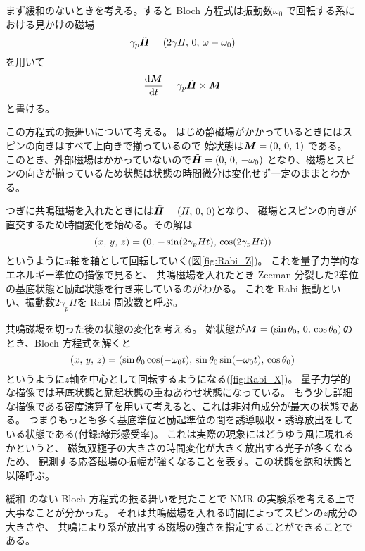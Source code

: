\documentclass[11pt,dvipdfmx,a4paper]{jsarticle}
\begin{document}
まず緩和のないときを考える。すると Bloch 方程式は振動数\(\omega_0\)%
で回転する系における見かけの磁場
\begin{equation}
	\gamma_p \vb*{\tilde{H}} = \qty(2\gamma H,\,0,\,\omega-\omega_0)
\end{equation}
を用いて
\begin{equation}
	\dv{\vb*{M}}{t} = \gamma_p \vb*{\tilde{H}} \times \vb*{M}
\end{equation}
と書ける。

この方程式の振舞いについて考える。
はじめ静磁場がかかっているときにはスピンの向きはすべて上向きで揃っているので
始状態は\(\vb*{M}=(0,\,0,\,1)\)
である。
このとき、外部磁場はかかっていないので\(\vb*{\tilde{H}}=(0,\,0,\,-\omega_0)\)
となり、磁場とスピンの向きが揃っているため状態は状態の時間微分は変化せず一定のままとわかる。

つぎに共鳴磁場を入れたときには\(\vb*{\tilde{H}}=(H,\,0,\,0)\)となり、
磁場とスピンの向きが直交するため時間変化を始める。その解は
\begin{equation}
	(x,\,y,\,z) = \qty(0,\,-\sin(2\gamma_p Ht),\,\cos(2\gamma_p Ht))
\end{equation}
というように\(x\)軸を軸として回転していく(図\ref{fig:Rabi_Z})。
これを量子力学的なエネルギー準位の描像で見ると、
共鳴磁場を入れたとき Zeeman 分裂した2準位の基底状態と励起状態を行き来しているのがわかる。
これを Rabi 振動といい、振動数\(2\gamma_p H\)を Rabi 周波数と呼ぶ。

共鳴磁場を切った後の状態の変化を考える。
始状態が\(\vb*{M}=(\sin\theta_0,\,0,\,\cos\theta_0)\)のとき、Bloch 方程式を解くと
\begin{equation}
	(x,\,y,\,z) =
	\qty(\sin\theta_0\cos(-\omega_0 t),\,
	\sin\theta_0\sin(-\omega_0 t),\,\cos\theta_0)
\end{equation}
というように\(z\)軸を中心として回転するようになる(\ref{fig:Rabi_X})。
量子力学的な描像では基底状態と励起状態の重ねあわせ状態になっている。
もう少し詳細な描像である密度演算子を用いて考えると、これは非対角成分が最大の状態である。
つまりもっとも多く基底準位と励起準位の間を誘導吸収・誘導放出をしている状態である(付録:線形感受率)。
これは実際の現象にはどうゆう風に現れるかというと、
磁気双極子の大きさの時間変化が大きく放出する光子が多くなるため、
観測する応答磁場の振幅が強くなることを表す。この状態を飽和状態と以降呼ぶ。

緩和 のない Bloch 方程式の振る舞いを見たことで NMR の実験系を考える上で大事なことが分かった。
それは共鳴磁場を入れる時間によってスピンの\(z\)成分の大きさや、
共鳴により系が放出する磁場の強さを指定することができることである。
\end{document}
